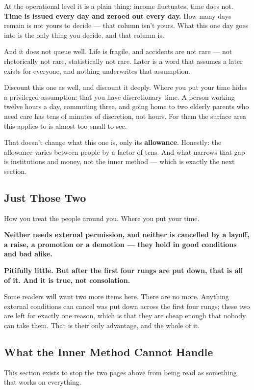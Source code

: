 \documentclass[11pt,a4paper]{article}
\begin{document}
At the operational level it is a plain thing: income fluctuates, time does not. \textbf{Time is issued every day and zeroed out every day.} How many days remain is not yours to decide --- that column isn't yours. What this one day goes into is the only thing you decide, and that column is.

And it does not queue well. Life is fragile, and accidents are not rare --- not rhetorically not rare, statistically not rare. Later is a word that assumes a later exists for everyone, and nothing underwrites that assumption.

Discount this one as well, and discount it deeply. Where you put your time hides a privileged assumption: that you have discretionary time. A person working twelve hours a day, commuting three, and going home to two elderly parents who need care has tens of minutes of discretion, not hours. For them the surface area this applies to is almost too small to see.

That doesn't change what this one is, only its \textbf{allowance}. Honestly: the allowance varies between people by a factor of tens. And what narrows that gap is institutions and money, not the inner method --- which is exactly the next section.

\subsection{Just Those Two}

How you treat the people around you. Where you put your time.

\textbf{Neither needs external permission, and neither is cancelled by a layoff, a raise, a promotion or a demotion --- they hold in good conditions and bad alike.}

\textbf{Pitifully little. But after the first four rungs are put down, that is all of it. And it is true, not consolation.}

Some readers will want two more items here. There are no more. Anything external conditions can cancel was put down across the first four rungs; these two are left for exactly one reason, which is that they are cheap enough that nobody can take them. That is their only advantage, and the whole of it.

\subsection{What the Inner Method Cannot Handle}

This section exists to stop the two pages above from being read as something that works on everything.
\end{document}
